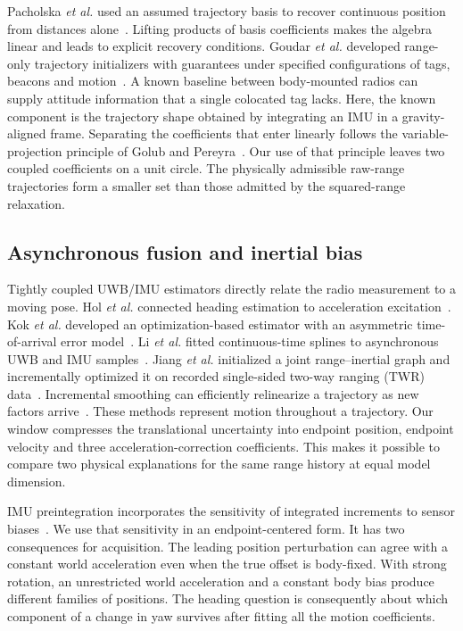 \documentclass{IEEEtaes}
\begin{document}
Pacholska \emph{et al.} used an assumed trajectory basis to recover continuous position from distances alone~\cite{pacholska}. Lifting products of basis coefficients makes the algebra linear and leads to explicit recovery conditions. Goudar \emph{et al.} developed range-only trajectory initializers with guarantees under specified configurations of tags, beacons and motion~\cite{goudar}. A known baseline between body-mounted radios can supply attitude information that a single colocated tag lacks. Here, the known component is the trajectory shape obtained by integrating an IMU in a gravity-aligned frame. Separating the coefficients that enter linearly follows the variable-projection principle of Golub and Pereyra~\cite{varpro}. Our use of that principle leaves two coupled coefficients on a unit circle. The physically admissible raw-range trajectories form a smaller set than those admitted by the squared-range relaxation.

\subsection{Asynchronous fusion and inertial bias}
Tightly coupled UWB/IMU estimators directly relate the radio measurement to a moving pose. Hol \emph{et al.} connected heading estimation to acceleration excitation~\cite{hol}. Kok \emph{et al.} developed an optimization-based estimator with an asymmetric time-of-arrival error model~\cite{kok}. Li \emph{et al.} fitted continuous-time splines to asynchronous UWB and IMU samples~\cite{sfuise}. Jiang \emph{et al.} initialized a joint range--inertial graph and incrementally optimized it on recorded single-sided two-way ranging (TWR) data~\cite{jiang}. Incremental smoothing can efficiently relinearize a trajectory as new factors arrive~\cite{isam2}. These methods represent motion throughout a trajectory. Our window compresses the translational uncertainty into endpoint position, endpoint velocity and three acceleration-correction coefficients. This makes it possible to compare two physical explanations for the same range history at equal model dimension.

IMU preintegration incorporates the sensitivity of integrated increments to sensor biases~\cite{forster}. We use that sensitivity in an endpoint-centered form. It has two consequences for acquisition. The leading position perturbation can agree with a constant world acceleration even when the true offset is body-fixed. With strong rotation, an unrestricted world acceleration and a constant body bias produce different families of positions. The heading question is consequently about which component of a change in yaw survives after fitting all the motion coefficients.
\end{document}
